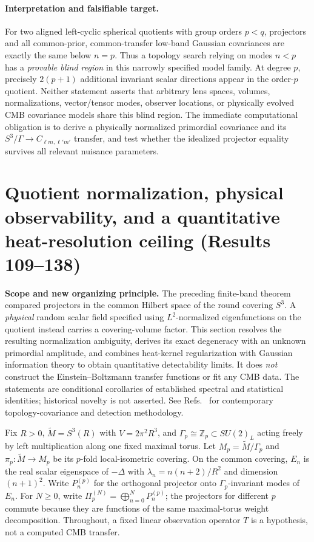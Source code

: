 \documentclass[aps,prd,onecolumn,notitlepage,groupedaddress,11pt]{revtex4-2}
\begin{document}
\paragraph{Interpretation and falsifiable target.}
For two aligned left-cyclic spherical quotients with group orders $p<q$, projectors and all common-prior, common-transfer low-band Gaussian covariances are exactly the same below $n=p$. Thus a topology search relying on modes $n<p$ has a \emph{provable blind region} in this narrowly specified model family. At degree $p$, precisely $2(p+1)$ additional invariant scalar directions appear in the order-$p$ quotient. Neither statement asserts that arbitrary lens spaces, volumes, normalizations, vector/tensor modes, observer locations, or physically evolved CMB covariance models share this blind region. The immediate computational obligation is to derive a physically normalized primordial covariance and its $S^3/\Gamma\to C_{\ell m,\ell'm'}$ transfer, and test whether the idealized projector equality survives all relevant nuisance parameters.

\section{Quotient normalization, physical observability, and a quantitative heat-resolution ceiling (Results 109--138)}
\label{sec:normalization_barrier}
\noindent\textbf{Scope and new organizing principle.} The preceding finite-band theorem compared projectors in the common Hilbert space of the round covering $S^3$. A \emph{physical} random scalar field specified using $L^2$-normalized eigenfunctions on the quotient instead carries a covering-volume factor. This section resolves the resulting normalization ambiguity, derives its exact degeneracy with an unknown primordial amplitude, and combines heat-kernel regularization with Gaussian information theory to obtain quantitative detectability limits. It does \emph{not} construct the Einstein--Boltzmann transfer functions or fit any CMB data. The statements are conditional corollaries of established spectral and statistical identities; historical novelty is not asserted. See Refs.~\cite{COMPACT2026Modes,COMPACT2026Detect,PRDTensorTopo2026} for contemporary topology-covariance and detection methodology.

Fix $R>0$, $\widetilde M=S^3(R)$ with $V=2\pi^2R^3$, and $\Gamma_p\cong\mathbb Z_p\subset SU(2)_L$ acting freely by left multiplication along one fixed maximal torus. Let $M_p=\widetilde M/\Gamma_p$ and $\pi_p:\widetilde M\to M_p$ be its $p$-fold local-isometric covering. On the common covering, $E_n$ is the real scalar eigenspace of $-\Delta$ with $\lambda_n=n(n+2)/R^2$ and dimension $(n+1)^2$. Write $P_n^{(p)}$ for the orthogonal projector onto $\Gamma_p$-invariant modes of $E_n$. For $N\ge0$, write $\Pi_p^{(N)}=\bigoplus_{n=0}^N P_n^{(p)}$; the projectors for different $p$ commute because they are functions of the same maximal-torus weight decomposition. Throughout, a fixed linear observation operator $T$ is a hypothesis, not a computed CMB transfer.
\end{document}
